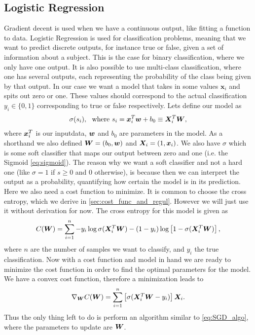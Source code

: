 \documentclass[12pt]{extarticle}
\begin{document}
\subsection{Logistic Regression}\label{sec:logistic_regression}
Gradient decent is used when we have a continuous output, like fitting a function to data. Logistic Regression is used for classification problems, meaning that we want to predict discrete outputs, for instance true or false, given a set of information about a subject. This is the case for binary classification, where we only have one output. It is also possible to use multi-class classification, where one has several outputs, each representing the probability of the class being given by that output. In our case we want a model that takes in some values $\mathbf{x}_i$ and spits out zero or one. These values should correspond to the actual classification $y_i\in\{0,1\}$ corresponding to true or false respectively. Lets define our model as
\begin{align}
	\sigma(s_i), \ \ \text{where }s_i = \boldsymbol x_i^T \boldsymbol w + b_0 \equiv \boldsymbol X_i^T \boldsymbol W,
	\label{eq:log_reg_model}
\end{align}
where $\boldsymbol x_i^T$ is our inputdata, $\boldsymbol w$ and $b_0$ are parameters in the model. As a shorthand we also defined $\boldsymbol W = (b_0, \boldsymbol w)$ and $\boldsymbol X_i = (1, \boldsymbol x_i)$. We also have $\sigma$ which is some soft classifier that maps our output between zero and one (i.e. the Sigmoid \eqref{eq:sigmoid}). The reason why we want a soft classifier and not a hard one (like $\sigma = 1$ if $s\geq0$ and $0$ otherwise), is because then we can interpret the output as a probability, quantifying how certain the model is in its prediction. Here we also need a cost function to minimize. It is common to choose the cross entropy, which we derive in \ref{sec:cost_func_and_regul}. However we will just use it without derivation for now. The cross entropy for this model is given as
\begin{align}
	C(\boldsymbol W) = \sum_{i = 1}^{n} -y_i \log\sigma(\boldsymbol X_i^T \boldsymbol W) - (1 - y_i)\log\left[1 - \sigma(\boldsymbol X^T_i \boldsymbol W)\right],
	\label{eq:cross_entropy2}
\end{align}
where $n$ are the number of samples we want to classify, and $y_i$ the true classification. Now with a cost function and model in hand we are ready to minimize the cost function in order to find the optimal parameters for the model. We have a convex cost function, therefore a minimization leads to
\begin{align}
	\nabla_{\boldsymbol W} C(\boldsymbol W) = \sum_{i = 1}^n \left[\sigma(\boldsymbol X_i^T \boldsymbol W - y_i)\right]\boldsymbol X_i.
	\label{eq:cross_entropy_grad}
\end{align}
Thus the only thing left to do is perform an algorithm similar to \ref{eq:SGD_algo}, where the parameters to update are $\boldsymbol W$.
\end{document}
